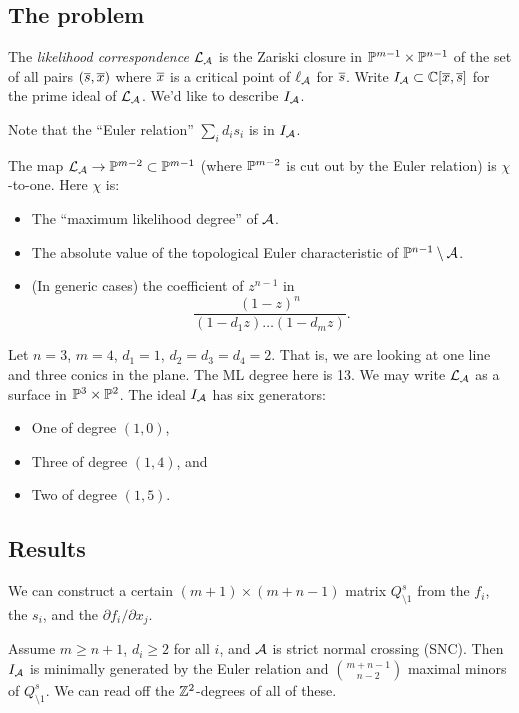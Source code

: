 \documentclass{article}
\begin{document}
\subsection{The problem}

The \emph{likelihood correspondence} $\mathcal{L}_{\mathcal{A}}$ is the Zariski closure in $\mathbb{P}^{m-1} \times \mathbb{P}^{n-1}$ of the set of all pairs $(\overline{s}, \overline{x})$ where $\overline{x}$ is a critical point of $\ell_{\mathcal{A}}$ for $\overline{s}$.
Write $I_{\mathcal{A}} \subset \mathbb{C}[\overline{x}, \overline{s}]$ for the prime ideal of $\mathcal{L}_{\mathcal{A}}$.
We'd like to describe $I_{\mathcal{A}}$.

Note that the ``Euler relation'' $\sum_i d_i s_i$ is in $I_{\mathcal{A}}$.

The map $\mathcal{L}_{\mathcal{A}} \to \mathbb{P}^{m-2} \subset \mathbb{P}^{m-1}$ (where $\mathbb{P}^{m-2}$ is cut out by the Euler relation) is $\chi$-to-one.
Here $\chi$ is:
\begin{itemize}
	\item The ``maximum likelihood degree'' of $\mathcal{A}$.
	\item The absolute value of the topological Euler characteristic of $\mathbb{P}^{n-1} \setminus \mathcal{A}$.
	\item (In generic cases) the coefficient of $z^{n-1}$ in
		\[
			\frac{(1 - z)^n}{(1 - d_1 z) \dots (1 - d_m z)}.
		\]
\end{itemize}

\begin{ex}
	Let $n = 3$, $m = 4$, $d_1 = 1$, $d_2 = d_3 = d_4 = 2$.
	That is, we are looking at one line and three conics in the plane.
	The ML degree here is 13.
	We may write $\mathcal{L}_{\mathcal{A}}$ as a surface in $\mathbb{P}^3 \times \mathbb{P}^2$.
	The ideal $I_{\mathcal{A}}$ has six generators:
	\begin{itemize}
		\item One of degree $(1, 0)$,
		\item Three of degree $(1, 4)$, and
		\item Two of degree $(1, 5)$.
	\end{itemize}
\end{ex}

\subsection{Results}

We can construct a certain $(m + 1) \times (m + n - 1)$ matrix $Q^s_{\setminus 1}$ from the $f_i$, the $s_i$, and the $\partial f_i / \partial x_j$.

\begin{thm}
	Assume $m \geq n + 1$, $d_i \geq 2$ for all $i$, and $\mathcal{A}$ is strict normal crossing (SNC).
	Then $I_{\mathcal{A}}$ is minimally generated by the Euler relation and $\binom{m+n-1}{n-2}$ maximal minors of $Q^s_{\setminus 1}$.
	We can read off the $\mathbb{Z}^2$-degrees of all of these.
\end{thm}
\end{document}
